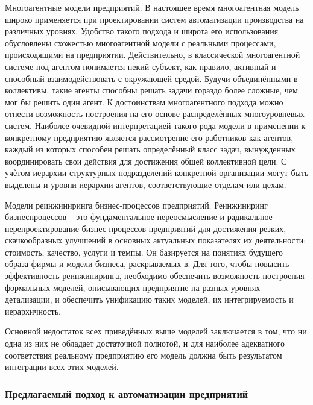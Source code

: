 \begin{textitemize}
    \item Многоагентные модели предприятий. В настоящее время многоагентная модель широко применяется при проектировании систем автоматизации производства на различных уровнях. Удобство такого подхода и широта его использования обусловлены схожестью многоагентной модели с реальными процессами, происходящими на предприятии. Действительно, в классической многоагентной системе под агентом понимается некий субъект, как правило, активный и способный взаимодействовать с окружающей средой. Будучи объединёнными в коллективы, такие агенты способны решать задачи гораздо более сложные, чем мог бы решить один агент. К достоинствам многоагентного подхода можно отнести возможность построения на его основе распределѐнных многоуровневых систем. Наиболее очевидной интерпретацией такого рода модели в применении к конкретному предприятию является рассмотрение его работников как агентов, каждый из которых способен решать определённый класс задач, вынужденных координировать свои действия для достижения общей коллективной цели. С учѐтом иерархии структурных подразделений конкретной организации могут быть выделены и уровни иерархии агентов, соответствующие отделам или цехам.
    \item Модели реинжиниринга бизнес-процессов предприятий. Реинжиниринг бизнеспроцессов – это фундаментальное переосмысление и радикальное перепроектирование бизнес-процессов предприятий для достижения резких, скачкообразных улучшений в основных актуальных показателях их деятельности: стоимость, качество, услуги и темпы. Он базируется на понятиях будущего образа фирмы и модели бизнеса, раскрываемых в. Для того, чтобы повысить эффективность реинжиниринга, необходимо обеспечить возможность построения формальных моделей, описывающих предприятие на разных уровнях детализации, и обеспечить унификацию таких моделей, их интегрируемость и иерархичность.
\end{textitemize}

Основной недостаток всех приведённых выше моделей заключается в том, что ни одна из них не обладает достаточной полнотой, и для наиболее адекватного соответствия реальному предприятию его модель должна быть результатом интеграции всех этих моделей.

\subsubsection{Предлагаемый подход к автоматизации предприятий}

